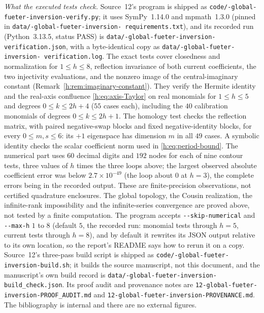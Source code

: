 \documentclass[11pt,a4paper]{article}
\numberwithin{equation}{section}
\theoremstyle{definition}
\theoremstyle{remark}
\theoremstyle{plain}
\newcommand{\hy}{-\allowbreak}                 %
\begin{document}
\emph{What the executed tests check.} Source~12's program is shipped as
\texttt{code/\hy global\hy fueter\hy inversion\hy verify.py}; it
uses SymPy~1.14.0 and mpmath~1.3.0 (pinned in
\texttt{data/\hy global\hy fueter\hy inversion\hy
requirements.txt}), and its recorded run (Python~3.13.5, status PASS) is
\texttt{data/\hy global\hy fueter\hy inversion\hy
verification.json}, with a byte-identical copy as
\texttt{data/\hy global\hy fueter\hy inversion\hy
verification.log}. The exact tests cover closedness and normalization for
$1\le h\le8$, reflection invariance of both current coefficients, the two
injectivity evaluations, and the nonzero image of the central-imaginary
constant (Remark~\ref{h:rem:imaginary-constant}). They verify the Hermite
identity and the real-axis confluence \eqref{h:eq:axis-Taylor} on real monomials
for $1\le h\le5$ and degrees $0\le k\le2h+4$ ($55$ cases each), including the
$40$ calibration monomials of degrees $0\le k\le2h+1$. The homology test checks
the reflection matrix, with paired negative-swap blocks and fixed
negative-identity blocks, for every $0\le m,s\le6$: its $+1$ eigenspace has
dimension $m$ in all $49$ cases. A symbolic identity checks the scalar
coefficient norm used in \eqref{h:eq:period-bound}. The numerical part uses $60$
decimal digits and $192$ nodes for each of nine contour tests, three values of
$h$ times the three loops above; the largest observed absolute coefficient
error was below $2.7\times10^{-49}$ (the loop about $0$ at $h=3$), the complete
errors being in the recorded output. These are finite-precision observations,
not certified quadrature enclosures. The global topology, the Cousin
realization, the infinite-rank impossibility and the infinite-series
convergence are proved above, not tested by a finite computation. The program
accepts \texttt{-{}-skip-numerical} and \texttt{-{}-max-h} $1$ to $8$ (default
$5$, the recorded run: monomial tests through $h=5$, current tests through
$h=8$), and by default it rewrites its JSON output relative to its own
location, so the report's README says how to rerun it on a copy. Source~12's
three-pass build script is shipped as
\texttt{code/\hy global\hy fueter\hy inversion\hy build.sh}; it
builds the source manuscript, not this document, and the manuscript's own
build record is
\texttt{data/\hy global\hy fueter\hy inversion\hy
build\_check.json}. Its proof audit and provenance notes are
\texttt{12\hy global\hy fueter\hy inversion\hy PROOF\_AUDIT.md} and
\texttt{12\hy global\hy fueter\hy inversion\hy PROVENANCE.md}. The
bibliography is internal and there are no external figures.
\end{document}
